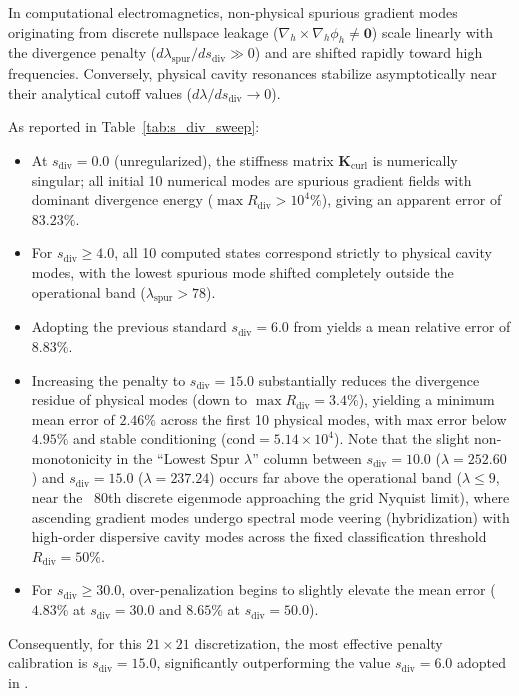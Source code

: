 \documentclass[preprint,12pt]{elsarticle}
\begin{document}
In computational electromagnetics, non-physical spurious gradient modes originating from discrete nullspace leakage ($\nabla_h \times \nabla_h \phi_h \neq \mathbf{0}$) scale linearly with the divergence penalty ($d\lambda_{\mathrm{spur}} / ds_{\mathrm{div}} \gg 0$) and are shifted rapidly toward high frequencies. Conversely, physical cavity resonances stabilize asymptotically near their analytical cutoff values ($d\lambda / ds_{\mathrm{div}} \to 0$).

As reported in Table~\ref{tab:s_div_sweep}:
\begin{itemize}
    \item At $s_{\mathrm{div}} = 0.0$ (unregularized), the stiffness matrix $\mathbf{K}_{\mathrm{curl}}$ is numerically singular; all initial 10 numerical modes are spurious gradient fields with dominant divergence energy ($\max R_{\mathrm{div}} > 10^4\%$), giving an apparent error of $83.23\%$.
    \item For $s_{\mathrm{div}} \ge 4.0$, all 10 computed states correspond strictly to physical cavity modes, with the lowest spurious mode shifted completely outside the operational band ($\lambda_{\mathrm{spur}} > 78$).
    \item Adopting the previous standard $s_{\mathrm{div}} = 6.0$ from \cite{stable_vnmm2d_2026} yields a mean relative error of $8.83\%$.
    \item Increasing the penalty to $s_{\mathrm{div}} = 15.0$ substantially reduces the divergence residue of physical modes (down to $\max R_{\mathrm{div}} = 3.4\%$), yielding a minimum mean error of $\mathbf{2.46\%}$ across the first 10 physical modes, with max error below $4.95\%$ and stable conditioning ($\mathrm{cond} = 5.14 \times 10^4$). Note that the slight non-monotonicity in the ``Lowest Spur $\lambda$'' column between $s_{\mathrm{div}} = 10.0$ ($\lambda = 252.60$) and $s_{\mathrm{div}} = 15.0$ ($\lambda = 237.24$) occurs far above the operational band ($\lambda \le 9$, near the ~80th discrete eigenmode approaching the grid Nyquist limit), where ascending gradient modes undergo spectral mode veering (hybridization) with high-order dispersive cavity modes across the fixed classification threshold $R_{\mathrm{div}} = 50\%$.
    \item For $s_{\mathrm{div}} \ge 30.0$, over-penalization begins to slightly elevate the mean error ($4.83\%$ at $s_{\mathrm{div}} = 30.0$ and $8.65\%$ at $s_{\mathrm{div}} = 50.0$).
\end{itemize}
Consequently, for this $21 \times 21$ discretization, the most effective penalty calibration is $s_{\mathrm{div}} = 15.0$, significantly outperforming the value $s_{\mathrm{div}} = 6.0$ adopted in \cite{stable_vnmm2d_2026}.
\end{document}
